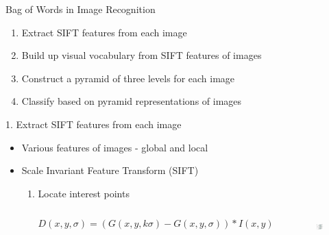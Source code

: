 \begin{frame}{Bag of Words in Image Recognition}
	\begin{enumerate}
		\item Extract \alert{SIFT} features from each image
		\item Build up \alert{visual vocabulary} from SIFT features of images
		\item Construct a \alert{pyramid} of three levels for each image
		\item \alert{Classify} based on pyramid representations of images
	\end{enumerate}
\end{frame}

\begin{frame}{1. Extract SIFT features from each image}
\begin{itemize}
	\item Various features of images - global and local
	\item Scale Invariant Feature Transform (SIFT)
		\begin{enumerate}
			\item Locate interest points
				\begin{columns}
						\begin{equation}
						D(x, y, \sigma) = (G(x, y, k\sigma) - G(x, y, \sigma)) * I(x, y)
						\end{equation}
						\begin{figure}[!ht]
							\centering
							\includegraphics[scale=0.5]{./sift1.png}
						\end{figure}


\end{columns}
\end{enumerate}
\end{itemize}
\end{frame}
